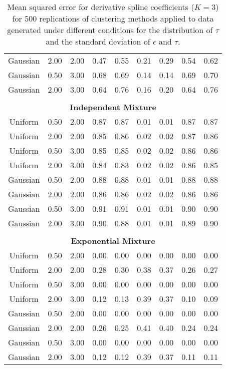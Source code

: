 \documentclass[12pt]{article}
\begin{document}
\begin{table}[ht]
\begin{center}
\begin{tabular}{ccc|cccccc}
  Gaussian & 2.00 & 2.00 & 0.47 & 0.55 & 0.21 & 0.29 & 0.54 & 0.62 \\ 
  Gaussian & 0.50 & 3.00 & 0.68 & 0.69 & 0.14 & 0.14 & 0.69 & 0.70 \\ 
  Gaussian & 2.00 & 3.00 & 0.64 & 0.76 & 0.16 & 0.20 & 0.64 & 0.76 \\ 
   \\ \multicolumn{9}{c}{\textbf{Independent Mixture}}\\Uniform & 0.50 & 2.00 & 0.87 & 0.87 & 0.01 & 0.01 & 0.87 & 0.87 \\ 
  Uniform & 2.00 & 2.00 & 0.85 & 0.86 & 0.02 & 0.02 & 0.87 & 0.86 \\ 
  Uniform & 0.50 & 3.00 & 0.85 & 0.85 & 0.02 & 0.02 & 0.86 & 0.86 \\ 
  Uniform & 2.00 & 3.00 & 0.84 & 0.83 & 0.02 & 0.02 & 0.86 & 0.85 \\ 
  Gaussian & 0.50 & 2.00 & 0.88 & 0.88 & 0.01 & 0.01 & 0.88 & 0.88 \\ 
  Gaussian & 2.00 & 2.00 & 0.86 & 0.86 & 0.02 & 0.02 & 0.86 & 0.86 \\ 
  Gaussian & 0.50 & 3.00 & 0.91 & 0.91 & 0.01 & 0.01 & 0.90 & 0.90 \\ 
  Gaussian & 2.00 & 3.00 & 0.90 & 0.88 & 0.01 & 0.01 & 0.89 & 0.90 \\ 
   \\ \multicolumn{9}{c}{\textbf{Exponential Mixture}}\\Uniform & 0.50 & 2.00 & 0.00 & 0.00 & 0.00 & 0.00 & 0.00 & 0.00 \\ 
  Uniform & 2.00 & 2.00 & 0.28 & 0.30 & 0.38 & 0.37 & 0.26 & 0.27 \\ 
  Uniform & 0.50 & 3.00 & 0.00 & 0.00 & 0.00 & 0.00 & 0.00 & 0.00 \\ 
  Uniform & 2.00 & 3.00 & 0.12 & 0.13 & 0.39 & 0.37 & 0.10 & 0.09 \\ 
  Gaussian & 0.50 & 2.00 & 0.00 & 0.00 & 0.00 & 0.00 & 0.00 & 0.00 \\ 
  Gaussian & 2.00 & 2.00 & 0.26 & 0.25 & 0.41 & 0.40 & 0.24 & 0.24 \\ 
  Gaussian & 0.50 & 3.00 & 0.00 & 0.00 & 0.00 & 0.00 & 0.00 & 0.00 \\ 
  Gaussian & 2.00 & 3.00 & 0.12 & 0.12 & 0.39 & 0.37 & 0.11 & 0.11 \\ 
   \hline\end{tabular}
\caption{Mean squared error for derivative spline coefficients ($K=3$) for 500 replications of clustering methods applied to data generated under different conditions for the distribution of $\tau$ and the standard deviation of $\epsilon$ and $\tau$.}
\label{tab:mse1}
\end{center}
\end{table}
\end{document}
